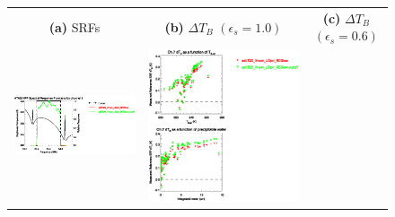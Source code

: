 \begin{figure}[H]
  \centering
  \begin{tabular}{c c c}
    \textsf{\textbf{(a)} SRFs} &
    \textsf{\textbf{(b)} $\Delta T_B$ $(\epsilon_s = 1.0)$} &
    \textsf{\textbf{(c)} $\Delta T_B$ $(\epsilon_s = 0.6)$} \\
    \includegraphics[bb=80 400 280 558,clip,scale=0.85]{graphics/srf/Rset/atms_npp.ch7.osrf.eps} &
    \includegraphics[bb=85 400 260 558,clip,scale=0.85]{graphics/dtb/Rset/e1.0_r0.0/atms_npp.ch7.dTb.eps} & 

\end{tabular}
\end{figure}
